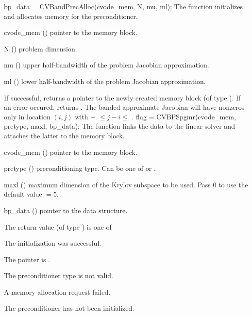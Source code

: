 {
  bp\_data = CVBandPrecAlloc(cvode\_mem, N, mu, ml);
}
{
  The function  initializes and allocates
  memory for the {\cvbandpre} preconditioner.
}
{
  \begin{args}
  \item[cvode\_mem] ()
    pointer to the {\cvode} memory block.
  \item[N] ()
    problem dimension.
  \item[mu] ()
    upper half-bandwidth of the problem Jacobian approximation.
  \item[ml] ()
    lower half-bandwidth of the problem Jacobian approximation.
  \end{args}
}
{
  If successful,  returns a pointer to the newly created 
  {\cvbandpre} memory block (of type ).
  If an error occured,  returns .
}
{
  The banded approximate Jacobian will have nonzeros only in location $(i,j)$
  with $-$ $\leq j-i \leq$ .
}
{
  flag = CVBPSpgmr(cvode\_mem, pretype, maxl, bp\_data);
}
{
  The function  links the {\cvbandpre} data to the
  {\cvspgmr} linear solver and attaches the latter to the {\cvode}
  memory block.
}
{
  \begin{args}
  \item[cvode\_mem] ()
    pointer to the {\cvode} memory block.
  \item[pretype] ()
    preconditioning type. Can be one of  or .
  \item[maxl] ()
    maximum dimension of the Krylov subspace to be used. Pass $0$ to use the 
    default value $=5$.
  \item[bp\_data] ()
    pointer to the {\cvbandpre} data structure.
  \end{args}
}
{
  The return value  (of type ) is one of
  \begin{args}
  \item[\Id{SUCCESS}] 
    The {\cvspgmr} initialization was successful.
  \item[\Id{LIN\_NO\_MEM}]
    The  pointer is .
  \item[\Id{LIN\_ILL\_INPUT}]
    The preconditioner type  is not valid.
  \item[\Id{LMEM\_FAIL}]
    A memory allocation request failed.
  \item[\Id{BP\_NO\_DATA}]
    The {\cvbandpre} preconditioner has not been initialized.
  \end{args}
}
